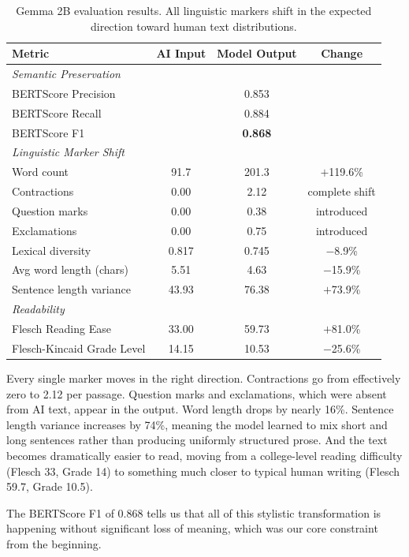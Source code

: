 \documentclass{article}
\begin{document}
\begin{table}[ht]
\centering
\caption{Gemma 2B evaluation results. All linguistic markers shift in the expected direction toward human text distributions.}
\label{tab:evaluation}
\vspace{4pt}
\begin{tabular}{lccc}
\toprule
\textbf{Metric} & \textbf{AI Input} & \textbf{Model Output} & \textbf{Change} \\
\midrule
\multicolumn{4}{l}{\textit{Semantic Preservation}} \\
BERTScore Precision & & 0.853 & \\
BERTScore Recall & & 0.884 & \\
BERTScore F1 & & \textbf{0.868} & \\
\midrule
\multicolumn{4}{l}{\textit{Linguistic Marker Shift}} \\
Word count & 91.7 & 201.3 & $+$119.6\% \\
Contractions & 0.00 & 2.12 & complete shift \\
Question marks & 0.00 & 0.38 & introduced \\
Exclamations & 0.00 & 0.75 & introduced \\
Lexical diversity & 0.817 & 0.745 & $-$8.9\% \\
Avg word length (chars) & 5.51 & 4.63 & $-$15.9\% \\
Sentence length variance & 43.93 & 76.38 & $+$73.9\% \\
\midrule
\multicolumn{4}{l}{\textit{Readability}} \\
Flesch Reading Ease & 33.00 & 59.73 & $+$81.0\% \\
Flesch-Kincaid Grade Level & 14.15 & 10.53 & $-$25.6\% \\
\bottomrule
\end{tabular}
\end{table}

Every single marker moves in the right direction. Contractions go from effectively zero to 2.12 per passage. Question marks and exclamations, which were absent from AI text, appear in the output. Word length drops by nearly 16\%. Sentence length variance increases by 74\%, meaning the model learned to mix short and long sentences rather than producing uniformly structured prose. And the text becomes dramatically easier to read, moving from a college-level reading difficulty (Flesch 33, Grade 14) to something much closer to typical human writing (Flesch 59.7, Grade 10.5).

The BERTScore F1 of 0.868 tells us that all of this stylistic transformation is happening without significant loss of meaning, which was our core constraint from the beginning.
\end{document}
